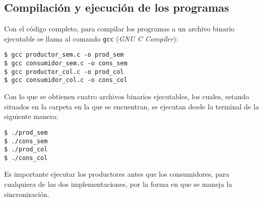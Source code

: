 \subsection{Compilación y ejecución de los programas}

Con el código completo, para compilar los programas a un archivo binario ejecutable se llama al comando \texttt{gcc} (\textit{GNU C Compiler}):

\begin{center}
    \texttt{\$ gcc productor\_sem.c -o prod\_sem}\\
    \texttt{\$ gcc consumidor\_sem.c -o cons\_sem}\\
    \texttt{\$ gcc productor\_col.c -o prod\_col}\\
    \texttt{\$ gcc consumidor\_col.c -o cons\_col}\\
\end{center}

Con lo que se obtienen cuatro archivos binarios ejecutables, los cuales, estando situados en la carpeta en la que se encuentran, se ejecutan desde la terminal de la siguiente manera:

\begin{center}
    \texttt{\$ ./prod\_sem}\\
    \texttt{\$ ./cons\_sem}\\
    \texttt{\$ ./prod\_col}\\
    \texttt{\$ ./cons\_col}\\
\end{center}

Es importante ejecutar los productores antes que los consumidores, para cualquiera de las dos implementaciones, por la forma en que se maneja la sincronización.